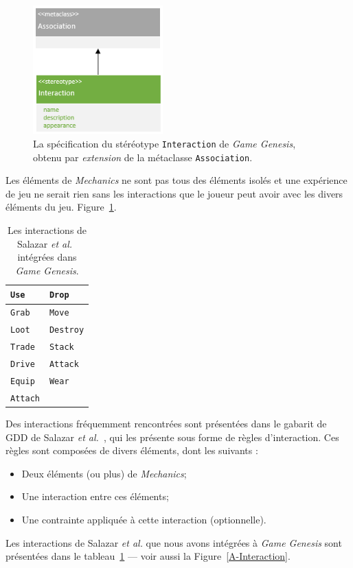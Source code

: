 \begin{figure}
    \centering
    \includegraphics[width=5cm]{10_img/chap5/metaclass_association.PNG} 
    \caption{La spécification du stéréotype \texttt{Interaction} de \emph{Game Genesis}, obtenu par \emph{extension} de la m\'etaclasse \texttt{Association}.}
    \label{fig.meta_assoc}
\end{figure}

Les éléments de \emph{Mechanics} ne sont pas tous des éléments isolés et une expérience de jeu ne serait rien sans les interactions que le joueur peut avoir avec les divers \'el\'ements du jeu.
%
 Figure~\ref{fig.meta_assoc}.

\begin{table}
\begin{center}
\begin{tabular}{|l|l|}\hline
\texttt{Use} &
\texttt{Drop}
\\\hline
\texttt{Grab} &
\texttt{Move}
\\\hline
\texttt{Loot} &
\texttt{Destroy}
\\\hline
\texttt{Trade} &
\texttt{Stack}
\\\hline
\texttt{Drive} &
\texttt{Attack}
\\\hline
\texttt{Equip} &
\texttt{Wear}
\\\hline
\texttt{Attach}&
\\\hline
\end{tabular}
\end{center}
\caption{Les interactions de Salazar \emph{et al.}~\cite{salazar_gdd} intégrées dans \emph{Game Genesis}.}
\label{table.interactions}
\end{table}


Des interactions fréquemment rencontrées sont présentées dans le gabarit de GDD de Salazar \emph{et al.}~\cite{salazar_gdd}, qui les présente sous forme de règles d'interaction.
Ces règles sont composées de divers éléments, dont les suivants :
\begin{itemize}
    \item Deux \'el\'ements (ou plus) de \emph{Mechanics};
    \item Une interaction entre ces \'el\'ements;
    \item Une contrainte appliquée à cette interaction (optionnelle).
\end{itemize}
Les interactions de Salazar \emph{et al.} que nous avons intégrées à \emph{Game Genesis} sont présentées dans le tableau~\ref{table.interactions} --- voir aussi la Figure~\ref{A-Interaction}.


